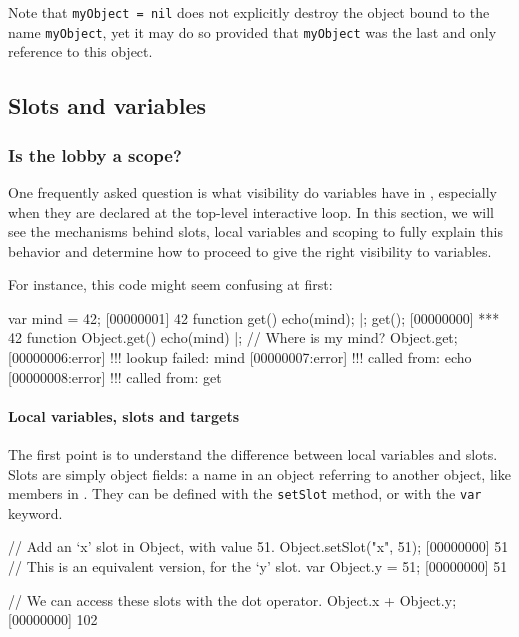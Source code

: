 Note that \lstinline{myObject = nil} does not explicitly destroy the
object bound to the name \lstinline{myObject}, yet it may do
so provided that \lstinline{myObject} was the last and only reference
to this object.

\subsection{Slots and variables}

\subsubsection{Is the lobby a scope?}

One frequently asked question is what visibility do variables have in
\us, especially when they are declared at the top-level interactive
loop.  In this section, we will see the mechanisms behind slots, local
variables and scoping to fully explain this behavior and determine how
to proceed to give the right visibility to variables.

For instance, this code might seem confusing at first:

\begin{urbiscript}
var mind = 42;
[00000001] 42
function get()
{
  echo(mind);
}|;
get();
[00000000] *** 42
function Object.get()
{
  echo(mind)
}|;
// Where is my mind?
Object.get;
[00000006:error] !!! lookup failed: mind
[00000007:error] !!!    called from: echo
[00000008:error] !!!    called from: get
\end{urbiscript}

\paragraph{Local variables, slots and targets}
The first point is to understand the difference between local
variables and slots. Slots are simply object fields: a name in an
object referring to another object, like members in \Cxx. They can be
defined with the \lstinline|setSlot| method, or with the
\lstinline|var| keyword.

\begin{urbiscript}
// Add an `x' slot in Object, with value 51.
Object.setSlot("x", 51);
[00000000] 51
// This is an equivalent version, for the `y' slot.
var Object.y = 51;
[00000000] 51

// We can access these slots with the dot operator.
Object.x + Object.y;
[00000000] 102
\end{urbiscript}

